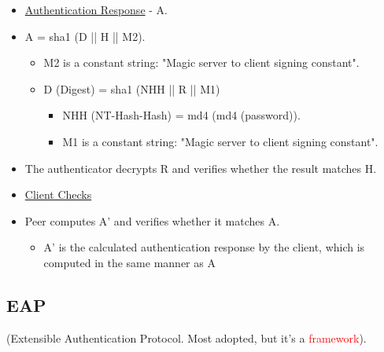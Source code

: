 \begin{tcolorbox}[colback=yellow!10!white, colframe=yellow!70!black, title=Authenticator \textrightarrow Peer] 
    
    \begin{itemize}
        \item \underline{Authentication Response} - A.
        \item A = sha1 (D || H || M2).
        \begin{itemize}
            \item M2 is a constant string: "Magic server to client signing constant".
            \item D (Digest) = sha1 (NHH || R || M1)
            
            \begin{itemize}
                \item NHH (NT-Hash-Hash) = md4 (md4 (password)).
                \item M1 is a constant string: "Magic server to client signing constant".
            \end{itemize}
        \end{itemize}
        \item The authenticator decrypts R and verifies whether the result matches H.
    \end{itemize}
    
\end{tcolorbox}

\begin{tcolorbox}[colback=yellow!10!white, colframe=yellow!70!black, title=Peer] 
    
    \begin{itemize}
        \item \underline{Client Checks}
        \item Peer computes A' and verifies whether it matches A.
        \begin{itemize}
            \item A' is the calculated authentication response by the client, which is computed in the same manner as A
        \end{itemize}
    \end{itemize}
    
\end{tcolorbox}

\subsection{EAP}
\begin{center}
    (Extensible Authentication Protocol. \newline Most adopted, but it's a \textcolor{red}{framework}).
\end{center}

